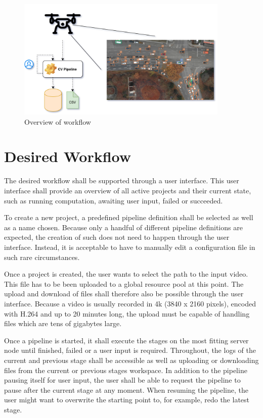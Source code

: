\begin{figure}[H]
	\centering
	\includegraphics[width=0.9\textwidth]{overview_3.png}
	\caption{Overview of workflow}
\end{figure}

\section{Desired Workflow}
\label{workflow}
\label{workflow:desired:docker}

The desired workflow shall be supported through a  user interface.
This user interface shall provide an overview of all active projects and their current state, such as running computation, awaiting user input, failed or succeeded.

To create a new project, a predefined pipeline definition shall be selected as well as a name chosen.
Because only a handful of different pipeline definitions are expected, the creation of such does not need to happen through the user interface.
Instead, it is acceptable to have to manually edit a configuration file in such rare circumstances.

Once a project is created, the user wants to select the path to the input video.
This file has to be been uploaded to a global resource pool at this point.
The upload and download of files shall therefore also be possible through the user interface.
Because a video is usually recorded in 4k (3840 x 2160 pixels), encoded with H.264 and up to 20 minutes long, the upload must be capable of handling files which are tens of gigabytes large.

Once a pipeline is started, it shall execute the stages on the most fitting server node until finished, failed or a user input is required.
Throughout, the logs of the current and previous stage shall be accessible as well as uploading or downloading files from the current or previous stages workspace.
In addition to the pipeline pausing itself for user input, the user shall be able to request the pipeline to pause after the current stage at any moment.
When resuming the pipeline, the user might want to overwrite the starting point to, for example, redo the latest stage.

